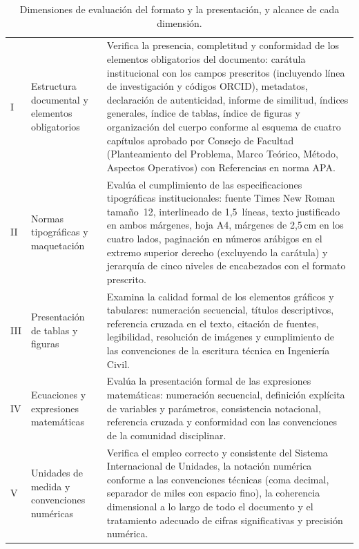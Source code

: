 \vspace{-10pt}
\begin{table}[htbp]
\centering
\scriptsize
\caption{Dimensiones de evaluación del formato y la presentación, y alcance de cada dimensión.}
\label{tab:dim-formato}
\begin{tabularx}{\textwidth}{|C{0.8cm}|L{2.5cm}|X|}
\hline
{}
 &  &  \\ \hline
I & Estructura documental y elementos obligatorios & Verifica la presencia, completitud y conformidad de los elementos obligatorios del documento: carátula institucional con los campos prescritos (incluyendo línea de investigación y códigos ORCID), metadatos, declaración de autenticidad, informe de similitud, índices generales, índice de tablas, índice de figuras y organización del cuerpo conforme al esquema de cuatro capítulos aprobado por Consejo de Facultad (Planteamiento del Problema, Marco Teórico, Método, Aspectos Operativos) con Referencias en norma APA. \\ \hline
{}
II & Normas tipográficas y maquetación & Evalúa el cumplimiento de las especificaciones tipográficas institucionales: fuente Times New Roman tamaño~12, interlineado de 1,5~líneas, texto justificado en ambos márgenes, hoja A4, márgenes de 2,5\,cm en los cuatro lados, paginación en números arábigos en el extremo superior derecho (excluyendo la carátula) y jerarquía de cinco niveles de encabezados con el formato prescrito. \\ \hline
III & Presentación de tablas y figuras & Examina la calidad formal de los elementos gráficos y tabulares: numeración secuencial, títulos descriptivos, referencia cruzada en el texto, citación de fuentes, legibilidad, resolución de imágenes y cumplimiento de las convenciones de la escritura técnica en Ingeniería Civil. \\ \hline
{}
IV & Ecuaciones y expresiones matemáticas & Evalúa la presentación formal de las expresiones matemáticas: numeración secuencial, definición explícita de variables y parámetros, consistencia notacional, referencia cruzada y conformidad con las convenciones de la comunidad disciplinar. \\ \hline
V & Unidades de medida y convenciones numéricas & Verifica el empleo correcto y consistente del Sistema Internacional de Unidades, la notación numérica conforme a las convenciones técnicas (coma decimal, separador de miles con espacio fino), la coherencia dimensional a lo largo de todo el documento y el tratamiento adecuado de cifras significativas y precisión numérica. \\ \hline
\end{tabularx}
\end{table}

